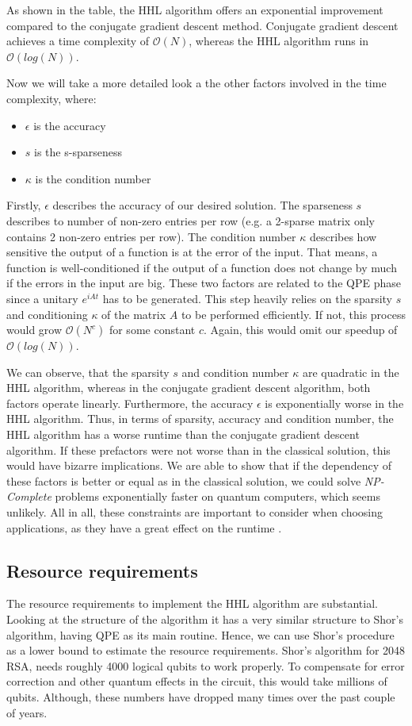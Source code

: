 As shown in the table, the HHL algorithm offers an exponential improvement compared to the conjugate gradient descent method.
Conjugate gradient descent achieves a time complexity of $\mathcal{O}(N)$, whereas the HHL algorithm runs in $\mathcal{O}(log(N))$.

Now we will take a more detailed look a the other factors involved in the time complexity, where:
\begin{itemize}
    \item $\epsilon$ is the accuracy
    \item $s$ is the s-sparseness
    \item $\kappa$ is the condition number
\end{itemize}

Firstly, $\epsilon$ describes the accuracy of our desired solution.
The sparseness $s$ describes to number of non-zero entries per row
(e.g. a 2-sparse matrix only contains 2 non-zero entries per row).
The condition number $\kappa$ describes how sensitive the output of a function is at the error of the input.
That means, a function is well-conditioned if the output of a function does not change by much if the errors in the input are big.
These two factors are related to the QPE phase since a unitary $e^{iAt}$ has to be generated. 
This step heavily relies on the sparsity $s$ and conditioning $\kappa$ of the matrix $A$ to be performed efficiently.
If not, this process would grow $\mathcal{O}(N^c)$ for some constant $c$.
Again, this would omit our speedup of $\mathcal{O}(log(N))$.

We can observe, that the sparsity $s$ and condition number $\kappa$ are quadratic in the HHL algorithm, whereas in the conjugate gradient descent algorithm, both factors operate linearly.
Furthermore, the accuracy $\epsilon$ is exponentially worse in the HHL algorithm. 
Thus, in terms of sparsity, accuracy and condition number, the HHL algorithm has a worse runtime than the conjugate gradient descent algorithm.
If these prefactors were not worse than in the classical solution, this would have bizarre implications. 
We are able to show that if the dependency of these factors is better or equal as in the classical solution, we could solve \textit{NP-Complete} problems exponentially faster on quantum computers, which seems unlikely.
All in all, these constraints are important to consider when choosing applications, as they have a great effect on the runtime \cite{fineprint}.


\subsection{Resource requirements}
The resource requirements to implement the HHL algorithm are substantial.
Looking at the structure of the algorithm it has a very similar structure to Shor's algorithm, having QPE as its main routine.
Hence, we can use Shor's procedure as a lower bound to estimate the resource requirements.
Shor's algorithm for 2048 RSA, needs roughly 4000 logical qubits to work properly. 
To compensate for error correction and other quantum effects in the circuit, this would take millions of qubits. 
Although, these numbers have dropped many times over the past couple of years.
